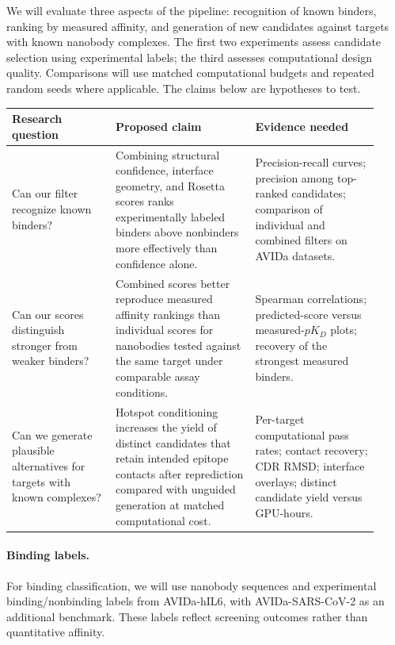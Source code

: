 We will evaluate three aspects of the pipeline: recognition of known binders,
ranking by measured affinity, and generation of new candidates against targets
with known nanobody complexes. The first two experiments assess candidate
selection using experimental labels; the third assesses computational design
quality. Comparisons will use matched computational budgets and repeated random
seeds where applicable. The claims below are hypotheses to test.

\begin{center}
\small
\begin{tabular}{@{}p{0.26\linewidth} p{0.35\linewidth} p{0.31\linewidth}@{}}
\toprule
\textbf{Research question} & \textbf{Proposed claim} & \textbf{Evidence needed} \\
\midrule
Can our filter recognize known binders?
& Combining structural confidence, interface geometry, and Rosetta scores
ranks experimentally labeled binders above nonbinders more effectively than
confidence alone.
& Precision-recall curves; precision among top-ranked candidates; comparison
of individual and combined filters on AVIDa datasets. \\
\addlinespace
Can our scores distinguish stronger from weaker binders?
& Combined scores better reproduce measured affinity rankings than individual
scores for nanobodies tested against the same target under comparable
assay conditions.
& Spearman correlations; predicted-score versus measured-$pK_D$ plots;
recovery of the strongest measured binders. \\
\addlinespace
Can we generate plausible alternatives for targets with known complexes?
& Hotspot conditioning increases the yield of distinct candidates that retain
intended epitope contacts after reprediction compared with unguided generation
at matched computational cost.
& Per-target computational pass rates; contact recovery; CDR RMSD;
interface overlays; distinct candidate yield versus GPU-hours. \\
\bottomrule
\end{tabular}
\end{center}

\paragraph{Binding labels.}
For binding classification, we will use nanobody sequences and experimental binding/nonbinding labels from AVIDa-hIL6, with AVIDa-SARS-CoV-2 as an additional benchmark. These labels reflect screening outcomes rather than quantitative affinity.

